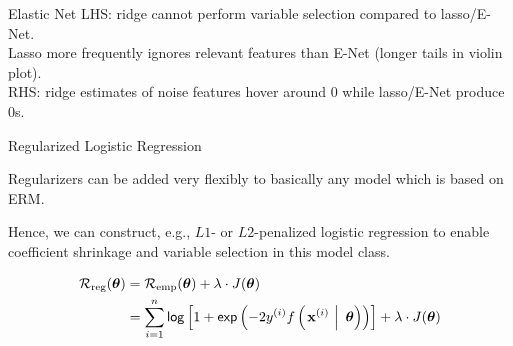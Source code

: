 \documentclass[11pt,compress,t,notes=noshow, xcolor=table]{beamer}
\begin{document}
\begin{vbframe} {Elastic Net}
\footnotesize
LHS: ridge cannot perform variable selection compared to lasso/E-Net. \\
Lasso more frequently ignores relevant features than E-Net (longer tails in violin plot).\\
RHS: ridge estimates of noise features hover around $0$ while lasso/E-Net produce $0$s.

\end{vbframe}



\begin{vbframe}{Regularized Logistic Regression}

Regularizers can be added very flexibly to basically any model which is based on ERM.

\lz 

Hence, we can construct, e.g., $L1$- or $L2$-penalized logistic regression to enable coefficient shrinkage and variable selection in this model class. 


\begin{align*}
\mathcal{R}_{\text{reg}}(\bm{\theta}) &= \mathcal{R}_{\text{emp}}(\bm{\theta}) + \lambda \cdot J(\bm{\theta}) \\
&= \sum\limits_{i=1}^n \mathsf{log}\left[1 + \mathsf{exp}\left(-2y^{(i)} f\left(\left.\mathbf{x}^{(i)}~\right|~ \bm{\theta}\right)\right)\right] + \lambda \cdot J(\bm{\theta})
\end{align*}


\end{vbframe}
\end{document}
